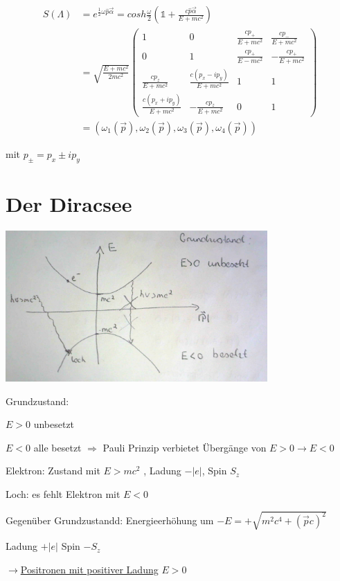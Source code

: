 \begin{align}
S(\Lambda) &= e^{\frac{1}{2}\omega\hat p \vec\alpha} = cosh\frac{\omega}{2}(\mathbb 1 + \frac{c\hat p\vec\alpha}{E+mc^2})\\
&=\sqrt{\frac{E+mc^2}{2mc^2}} \begin{pmatrix}1&0&\frac{cp_+}{E+mc^2}&\frac{cp_-}{E+mc^2}\\0&1&\frac{cp_+}{E-mc^2} &-\frac{cp_+}{E+mc^2}\\\frac{cp_z}{E+mc^2} &\frac{c(p_x-ip_y)}{E+mc^2}&1&1\\\frac{c(p_x+ip_y)}{E+mc^2} &-\frac{cp_z}{E+mc^2} &0&1\end{pmatrix} \\
&= (\omega_1(\vec p),\omega_2(\vec p), \omega_3(\vec p),\omega_4(\vec p))
\end{align}

mit \(p_\pm = p_x\pm ip_y\)


\section{Der Diracsee}



\includegraphics[width=0.75\textwidth]{kap06_02.png}

Grundzustand:

 \(E>0\) unbesetzt

\(E<0\) alle besetzt \(\Rightarrow \) Pauli Prinzip verbietet Übergänge von \(E>0 \rightarrow E<0 \)

Elektron: Zustand mit \(E>mc^2\) , Ladung \(-|e|\), Spin \(S_z\)

Loch: es fehlt Elektron mit \(E<0\)

Gegenüber Grundzustandd: Energieerhöhung um \(-E = +\sqrt{m^2c^4+(\vec pc)^2}\)

Ladung \(+|e|\)
Spin \(-S_z\)

\(\rightarrow \)\underline{Positronen mit positiver Ladung} \(E>0\)

